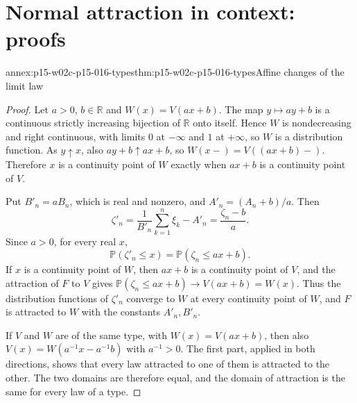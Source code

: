 \section{Normal attraction in context: proofs}
\label{sec:annex-p15-w02c-p15-016}

\begin{annexitem}{annex:p15-w02c-p15-016-types}{thm:p15-w02c-p15-016-types}{Affine changes of the limit law}
\begin{proof}
Let \(a>0\), \(b\in\mathbb R\) and \(W(x)=V(ax+b)\). The map
\(y\mapsto ay+b\) is a continuous strictly increasing bijection of
\(\mathbb R\) onto itself. Hence \(W\) is nondecreasing and right
continuous, with limits \(0\) at \(-\infty\) and \(1\) at \(+\infty\),
so \(W\) is a distribution function. As \(y\uparrow x\), also
\(ay+b\uparrow ax+b\), so \(W(x-)=V((ax+b)-)\). Therefore \(x\) is a
continuity point of \(W\) exactly when \(ax+b\) is a continuity point
of \(V\).

Put \(B'_n=aB_n\), which is real and nonzero, and
\(A'_n=(A_n+b)/a\). Then
\[
 \zeta'_n=\frac1{B'_n}\sum_{k=1}^n\xi_k-A'_n
 =\frac{\zeta_n-b}a .
\]
Since \(a>0\), for every real \(x\),
\[
 \mathbb P(\zeta'_n\leq x)=\mathbb P(\zeta_n\leq ax+b).
\]
If \(x\) is a continuity point of \(W\), then \(ax+b\) is a continuity
point of \(V\), and the attraction of \(F\) to \(V\) gives
\(\mathbb P(\zeta_n\leq ax+b)\to V(ax+b)=W(x)\). Thus the distribution
functions of \(\zeta'_n\) converge to \(W\) at every continuity point
of \(W\), and \(F\) is attracted to \(W\) with the constants
\(A'_n,B'_n\).

If \(V\) and \(W\) are of the same type, with \(W(x)=V(ax+b)\), then
also \(V(x)=W(a^{-1}x-a^{-1}b)\) with \(a^{-1}>0\). The first part,
applied in both directions, shows that every law attracted to one of
them is attracted to the other. The two domains are therefore equal,
and the domain of attraction is the same for every law of a type.
\end{proof}
\end{annexitem}

